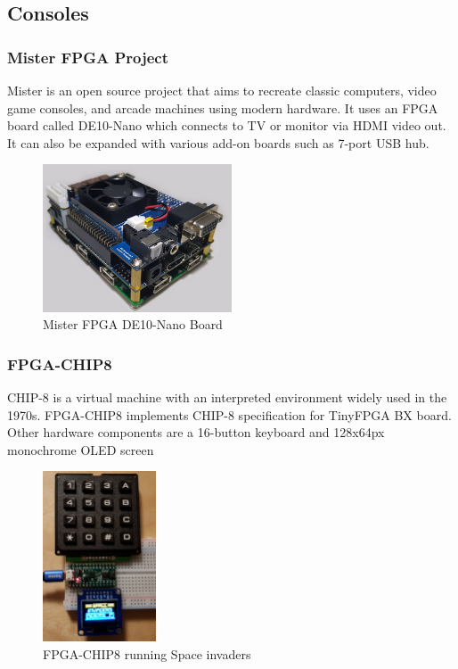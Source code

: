 \documentclass[a4paper,12pt]{article}
\begin{document}
    \subsection{Consoles}

    \subsubsection{Mister FPGA Project}
    Mister is an open source project that aims to recreate classic computers, video game consoles, and arcade machines using modern hardware. It uses an FPGA board called DE10-Nano which connects to TV or monitor via HDMI video out. It can also be expanded with various add-on boards such as 7-port USB hub.

    \begin{figure}[h]
    \centering
    \includegraphics[width=0.5\textwidth]{images/mister.png} 
    \caption{Mister FPGA DE10-Nano Board}
    \end{figure}

    \subsubsection{FPGA-CHIP8} 
    CHIP-8 is a virtual machine with an interpreted environment widely used in the 1970s.
    FPGA-CHIP8 implements CHIP-8 specification for TinyFPGA BX board. Other hardware components are a 16-button keyboard and 128x64px monochrome OLED screen
    \begin{figure}[H]
    \centering
    \includegraphics[width=0.3\textwidth]{images/chip8-fpga.png} 
    \caption{FPGA-CHIP8 running Space invaders}
    \end{figure}
\end{document}
